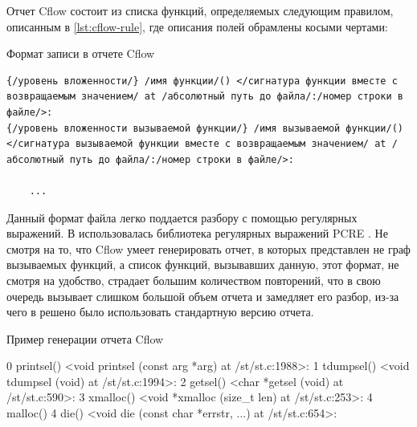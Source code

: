 Отчет Cflow состоит из списка функций, определяемых следующим правилом, описанным в \autoref{lst:cflow-rule},
где описания полей обрамлены косыми чертами:

\begin{ListingEnv}[!h]
    \captiondelim{ }
    \caption{Формат записи в отчете Cflow}\label{lst:cflow-rule}
    \begin{lstlisting}[]
{/уровень вложенности/} /имя функции/() </сигнатура функции вместе с возвращаемым значением/ at /абсолютный путь до файла/:/номер строки в файле/>:
{/уровень вложенности вызываемой функции/} /имя вызываемой функции/() </сигнатура вызываемой функции вместе с возвращаемым значением/ at /абсолютный путь до файла/:/номер строки в файле/>:

    ... 
    \end{lstlisting}
\end{ListingEnv}

Данный формат файла легко поддается разбору с помощью регулярных выражений. В {\ProgModule} использовалась
библиотека регулярных выражений PCRE \autocite{pcre}.
Не смотря на то, что Cflow умеет генерировать отчет, в которых представлен не граф вызываемых функций,
а список функций, вызывавших данную, этот формат, не смотря на удобство, страдает большим количеством
повторений, что в свою очередь вызывает слишком большой объем отчета и замедляет его разбор, из-за
чего в {\ProgModule} решено было использовать стандартную версию отчета.

\begin{ListingEnv}[!h]
    \captiondelim{ }
    \caption{Пример генерации отчета Cflow}\label{lst:cflow-example}
    \begin{Verb}[]
{   0} printsel() <void printsel (const arg *arg) at /st/st.c:1988>:
{   1}  tdumpsel() <void tdumpsel (void) at /st/st.c:1994>:
{   2}    getsel() <char *getsel (void) at /st/st.c:590>:
{   3}      xmalloc() <void *xmalloc (size_t len) at /st/st.c:253>:
{   4}        malloc()
{   4}        die() <void die (const char *errstr, ...) at /st/st.c:654>:
    \end{Verb}
\end{ListingEnv}

